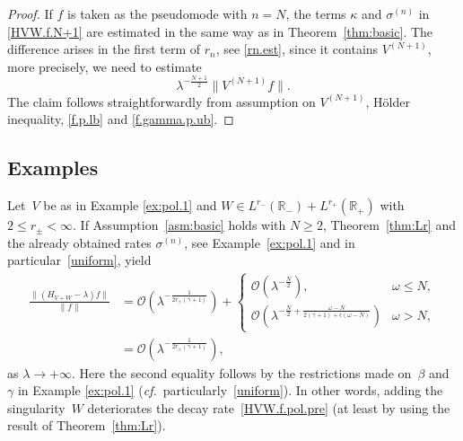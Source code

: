 \begin{proof}
If $f$ is taken as the pseudomode with $n=N$, the terms $\kappa$ 
and $\sigma^{(n)}$ in \eqref{HVW.f.N+1} are estimated in the same way as in Theorem~\ref{thm:basic}. The difference arises in the first term of $r_n$, 
see \eqref{rn.est}, since it contains $V^{(N+1)}$, more precisely, we need to estimate
\begin{equation}
\lambda^{-\frac{N+1}{2}} \|V^{(N+1)}f\|. 
\end{equation}
The claim follows straightforwardly from assumption on $V^{(N+1)}$, H\"older inequality, \eqref{f.p.lb} and \eqref{f.gamma.p.ub}.
\end{proof}

\subsection{Examples}
\begin{Example}
	\label{ex:pol.2}
Let~$V$ be as in Example \ref{ex:pol.1} and $W \in L^{r_-}({\mathbb{R}}_-) + L^{r_+}({\mathbb{R}}_+)$ with $2 \leq r_\pm <\infty$. If Assumption~\ref{asm:basic} holds with $N \geq 2$, 
Theorem~\ref{thm:Lr} and the already obtained rates $\sigma^{(n)}$, 
see Example~\ref{ex:pol.1} and in particular~\eqref{uniform}, yield
\begin{align}\label{HVW.f.pol}
\frac{\|(H_{V+W}-\lambda) f\|}{\|f\|} 
&= 
{\mathcal{O}}\left(
\lambda^{-\frac{ 1 }{2 r_\pm(\gamma+1)}} 
\right)
+
\begin{cases}
{\mathcal{O}} \left(\lambda^{- \frac N2} \right), & \omega \leq N, 
\\[1mm]
{\mathcal{O}} \left(\lambda^{- \frac{N}{2} + \frac{\omega-N}{2(\gamma+1) + \epsilon(\omega-N)  }} \right)
& \omega > N,
\end{cases}
\nonumber \\
&= {\mathcal{O}}\left(
\lambda^{-\frac{ 1 }{2 r_\pm(\gamma+1)}} 
\right), 
\end{align}
as $\lambda \to + \infty$.
Here the second equality follows by the restrictions
made on~$\beta$ and~$\gamma$ in Example \ref{ex:pol.1}
({\emph{cf.}}~particularly~\eqref{uniform}).
In other words, adding the singularity~$W$ 
deteriorates the decay rate~\eqref{HVW.f.pol.pre}
(at least by using the result of Theorem~\ref{thm:Lr}).
\end{Example}

